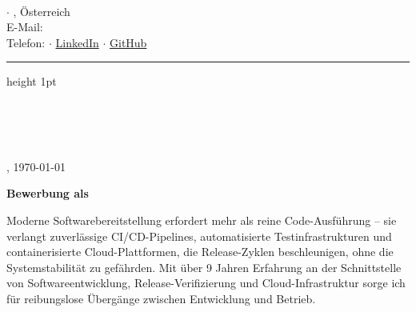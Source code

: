 \documentclass[11pt,a4paper]{article}
\begin{document}
\begin{minipage}[t]{0.55\textwidth}
    {\Large \bfseries \color{primary} \meinName}\\[0.2em]
    {\small \color{accent} \bfseries \stellenTitel}
\end{minipage}
\begin{minipage}[t]{0.45\textwidth}
    \raggedleft \footnotesize \color{textgray}
    \meineStrasse $\cdot$ \meinOrt, Österreich\\
    E-Mail: \href{mailto:\meineEmail}{\meineEmail}\\
    Telefon: \meineTel $\cdot$ \href{\meinLinkedin}{LinkedIn} $\cdot$ \href{\meinGithub}{GitHub}
\end{minipage}

\vspace{0.8em}
\color{accent}\hrule height 1pt
\vspace{1.0em}

\begin{minipage}[t]{0.55\textwidth}
    \color{primary} \small
    \textbf{\firmenName}\\[0.15em]
    \ansprechPartner\\[0.15em]
    \firmenAdresse\\[0.15em]
\end{minipage}
\begin{minipage}[t]{0.45\textwidth}
    \raggedleft \small \color{textgray}
    \meinOrt, \today
\end{minipage}

\vspace{1.2em}

\vspace{0.8cm}
{\Large\bfseries\color{primary} Bewerbung als \stellenTitel}


\vspace{0.6em}

\color{primary} \small

\anrede

Moderne Softwarebereitstellung erfordert mehr als reine Code-Ausführung – sie verlangt zuverlässige CI/CD-Pipelines, automatisierte Testinfrastrukturen und containerisierte Cloud-Plattformen, die Release-Zyklen beschleunigen, ohne die Systemstabilität zu gefährden. Mit über 9 Jahren Erfahrung an der Schnittstelle von Softwareentwicklung, Release-Verifizierung und Cloud-Infrastruktur sorge ich für reibungslose Übergänge zwischen Entwicklung und Betrieb.
\end{document}
